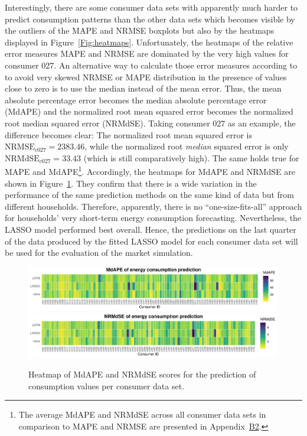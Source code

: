 Interestingly, there are some consumer data sets with apparently much harder to predict consumption patterns than the other data sets which becomes visible by the outliers of the MAPE and NRMSE boxplots but also by the heatmaps displayed in Figure~\ref{Fig:heatmaps}. Unfortunately, the heatmaps of the relative error measures MAPE and NRMSE are dominated by the very high values for consumer 027. An alternative way to calculate those error measures according to \citet{Hyndman:2006} to avoid very skewed NRMSE or MAPE distribution in the presence of values close to zero is to use the median instead of the mean error. Thus, the mean absolute percentage error becomes the median absolute percentage error (MdAPE) and the normalized root mean squared error becomes the normalized root median squared error (NRMdSE). Taking consumer 027 as an example, the difference becomes clear: The normalized root mean squared error is $\text{NRMSE}_{c027}=2383.46$, while the normalized root \emph{median} squared error is only $\text{NRMdSE}_{c027}=33.43$ (which is still comparatively high). The same holds true for MAPE and MdAPE\footnote{The average MdAPE and NRMdSE across all consumer data sets in comparison to MAPE and NRMSE are presented in Appendix~\hyperlink{AppB2:Tables:avg_errM_wMedian}{B2}.}. Accordingly, the heatmaps for MdAPE and NRMdSE are shown in Figure~\ref{Fig:heatmaps_median}. They confirm that there is a wide variation in the performance of the same prediction methods on the same kind of data but from different households. Therefore, apparently, there is no ``one-size-fits-all'' approach for households' very short-term energy consumption forecasting. Nevertheless, the LASSO model performed best overall. Hence, the predictions on the last quarter of the data produced by the fitted LASSO model for each consumer data set will be used for the evaluation of the market simulation.
%
\begin{figure}[htbp]
 \centering
 \includegraphics[width=\textwidth]{thesis/graphs/evaluation/c_heatmap_MdAPE.pdf}
 \includegraphics[width=\textwidth]{thesis/graphs/evaluation/c_heatmap_NRMdSE.pdf}
\caption[Heatmaps of MdAPE and NRMdSE for consumption values]{Heatmap of MdAPE and NRMdSE scores for the prediction of consumption values per consumer data set. \quantnet\href{ }{}}
\label{Fig:heatmaps_median}
\end{figure}
%

